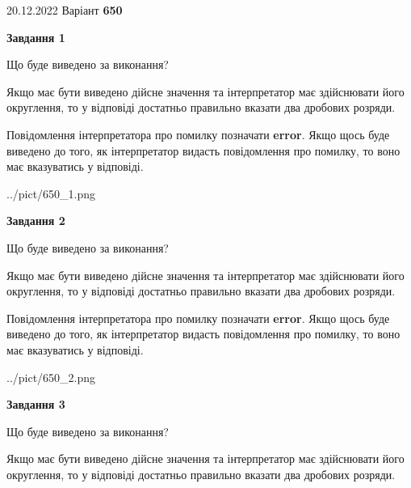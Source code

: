 \documentclass[12pt, ukrainian]{article}
\begin{document}
{20.12.2022 Варіант \No \textbf { 650 }\par}
{
\begin {Large}

{\begin {center}\textbf{Завдання 1}\end {center}}\par
Що буде виведено за виконання? \par

Якщо має бути виведено дійсне значення та інтерпретатор має здійснювати його округлення, 
то у відповіді достатньо правильно вказати два дробових розряди.

Повідомлення інтерпретатора про помилку позначати \textbf{error}.
Якщо щось буде виведено до того, як інтерпретатор видасть повідомлення про помилку, 
то воно має вказуватись у відповіді. \par

\begin{center}
	{../pict/650_1.png}
\end{center}
\newpage

{\begin {center}\textbf{Завдання 2}\end {center}}\par
Що буде виведено за виконання? \par

Якщо має бути виведено дійсне значення та інтерпретатор має здійснювати його округлення, 
то у відповіді достатньо правильно вказати два дробових розряди.

Повідомлення інтерпретатора про помилку позначати \textbf{error}.
Якщо щось буде виведено до того, як інтерпретатор видасть повідомлення про помилку, 
то воно має вказуватись у відповіді. \par

\begin{center}
	{../pict/650_2.png}
\end{center}
\newpage

{\begin {center}\textbf{Завдання 3}\end {center}}\par
Що буде виведено за виконання? \par

Якщо має бути виведено дійсне значення та інтерпретатор має здійснювати його округлення, 
то у відповіді достатньо правильно вказати два дробових розряди.


\end{Large}}
\end{document}
